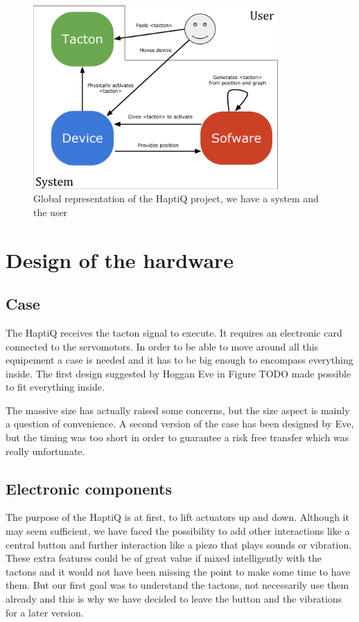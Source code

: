 \begin{figure}[!ht]
  \centering
  \includegraphics[height=7cm]{figures/haptiq_global.png}
  \caption{Global representation of the HaptiQ project, we have a system and the user}
\end{figure}

\section{Design of the hardware}\label{design-of-the-hardware}

\subsection{Case}\label{case}

The HaptiQ receives the tacton signal to execute. It requires an electronic card connected to the servomotors. In order to be able to move around all this equipement a case is needed and it has to be big enough to encompass everything inside. The first design suggested by Hoggan Eve in Figure TODO made possible to fit everything inside. 

The massive size has actually raised some concerns, but the size aspect is mainly a question of convenience. A second version of the case has been designed by Eve, but the timing was too short in order to guarantee a risk free transfer which was really unfortunate.

\subsection{Electronic components}

The purpose of the HaptiQ is at first, to lift actuators up and down. Although it may seem sufficient, we have faced the possibility to add other interactions like a central button and further interaction like a piezo that plays sounds or vibration. These extra features could be of great value if mixed intelligently with the tactons and it would not have been missing the point to make some time to have them. But our first goal was to understand the tactons, not necessarily use them already and this is why we have decided to leave the button and the vibrations for a later version.

